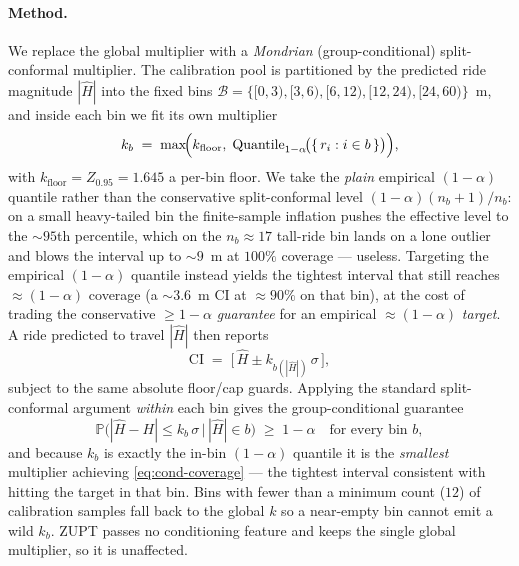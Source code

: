 \paragraph{Method.} We replace the global multiplier with a
\emph{Mondrian} (group-conditional) split-conformal multiplier. The
calibration pool is partitioned by the predicted ride magnitude
$|\hat H|$ into the fixed bins
$\mathcal{B} = \{[0,3),[3,6),[6,12),[12,24),[24,60)\}$~m, and inside
each bin we fit its own multiplier
\begin{equation}
  k_b \;=\;
  \max\!\Bigl(k_{\mathrm{floor}},\;
  \mathrm{Quantile}_{1-\alpha}\!\bigl(\{\,r_i : i \in b\,\}\bigr)\Bigr),
  \label{eq:mondrian-kbin}
\end{equation}
with $k_{\mathrm{floor}} = Z_{0.95}=1.645$ a per-bin floor. We take the
\emph{plain} empirical $(1-\alpha)$ quantile rather than the
conservative split-conformal level $(1-\alpha)(n_b+1)/n_b$: on a small
heavy-tailed bin the finite-sample inflation pushes the effective level
to the $\sim\!95$th percentile, which on the $n_b\!\approx\!17$
tall-ride bin lands on a lone outlier and blows the interval up to
$\sim\!9$~m at $100\%$ coverage --- useless. Targeting the empirical
$(1-\alpha)$ quantile instead yields the tightest interval that still
reaches $\approx(1-\alpha)$ coverage (a $\sim\!3.6$~m CI at
$\approx\!90\%$ on that bin), at the cost of trading the conservative
$\ge 1-\alpha$ \emph{guarantee} for an empirical $\approx(1-\alpha)$
\emph{target}. A ride predicted to travel $|\hat H|$ then reports
\begin{equation}
  \mathrm{CI} \;=\; \bigl[\,\hat H \pm k_{b(|\hat H|)}\,\sigma\,\bigr],
  \label{eq:mondrian-ci}
\end{equation}
subject to the same absolute floor/cap guards. Applying the standard
split-conformal argument \emph{within} each bin gives the
group-conditional guarantee
\begin{equation}
  \mathbb{P}\bigl(|\hat H - H| \le k_b\,\sigma \,\big|\, |\hat H|\in b\bigr)
  \;\ge\; 1-\alpha
  \quad\text{for every bin } b,
  \label{eq:cond-coverage}
\end{equation}
and because $k_b$ is exactly the in-bin $(1-\alpha)$ quantile it is the
\emph{smallest} multiplier achieving \eqref{eq:cond-coverage} --- the
tightest interval consistent with hitting the target in that bin. Bins
with fewer than a minimum count ($12$) of calibration samples fall back
to the global $k$ so a near-empty bin cannot emit a wild $k_b$. ZUPT
passes no conditioning feature and keeps the single global multiplier,
so it is unaffected.

